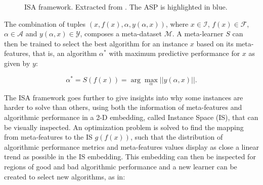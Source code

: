 \begin{figure}[ht]
	\caption{ISA framework. Extracted from \cite{Munoz2018}. The ASP is highlighted in blue.} \label{fig:ISA_flowchart}
\end{figure}

The combination of tuples $(x, f(x), \alpha, y(\alpha, x))$, where $x \in \mathcal{I}$, $f(x) \in \mathcal{F}$, $\alpha \in \mathcal{A}$ and $y(\alpha, x) \in \mathcal{Y}$, composes a meta-dataset $\mathcal{M}$. A meta-learner $S$ can then be trained to select the best algorithm for an instance $x$ based on its meta-features, that is, an algorithm $\alpha^*$ with maximum predictive performance for $x$ as given by $y$: 

\begin{equation} \label{eq:algo_selection}
	\alpha^* = S(f(x)) = \arg \max_{\alpha} ||y(\alpha, x)||.
\end{equation}

The ISA framework goes further to give insights into why some instances are harder to solve than others, using both the information of meta-features and algorithmic performance in a 2-D embedding, called Instance Space (IS), that can be visually inspected. An optimization problem is solved to find the mapping from meta-features to the IS $g(f(x))$, such that the distribution of algorithmic performance metrics and meta-features values display as close a linear trend as possible in the IS embedding. This embedding can then be inspected for regions of good and bad algorithmic performance and a new learner can be created to select new algorithms, as in:

